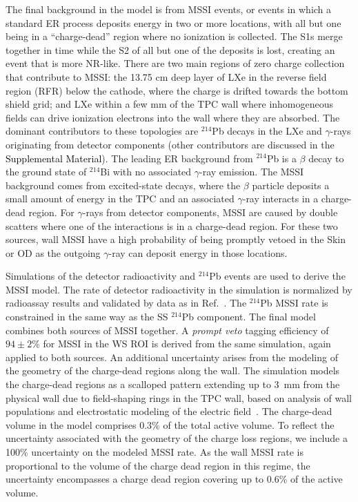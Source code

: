 The final background in the model is from MSSI events, or events in which a standard ER process deposits energy in two or more locations, with all but one being in a ``charge-dead'' region where no ionization is collected.
The S1s merge together in time while the S2 of all but one of the deposits is lost, creating an event that is more NR-like.
There are two main regions of zero charge collection that contribute to MSSI: the 13.75 cm deep layer of LXe in the reverse field region (RFR) below the cathode, where the charge is drifted towards the bottom shield grid; and LXe within a few mm of the TPC wall where inhomogeneous fields can drive ionization electrons into the wall where they are absorbed.
The dominant contributors to these topologies are $^{214}$Pb decays in the LXe and $\gamma$-rays originating from detector components (other contributors are discussed in the \textcolor{black}{Supplemental Material}).
The leading ER background from $^{214}$Pb is a $\beta$ decay to the ground state of $^{214}$Bi with no associated $\gamma$-ray emission.
The MSSI background comes from excited-state decays, where the $\beta$ particle deposits a small amount of energy in the TPC and an associated $\gamma$-ray interacts in a charge-dead region.
For $\gamma$-rays from detector components, MSSI are caused by double scatters where one of the interactions is in a charge-dead region.
For these two sources, wall MSSI have a high probability of being promptly vetoed in the Skin or OD as the outgoing $\gamma$-ray can deposit energy in those locations. 

Simulations of the detector radioactivity and $^{214}$Pb events are used to derive the MSSI model.  The rate of detector radioactivity in the simulation is normalized by radioassay results and validated by data as in Ref.~\cite{LZ:SR1Backgrounds_2022}. The $^{214}$Pb MSSI rate is constrained in the same way as the SS $^{214}$Pb component. The final model combines both sources of MSSI together. 
A \emph{prompt veto} tagging efficiency of $94\pm2$\% for MSSI in the WS ROI is derived from the same simulation, again applied to both sources. An additional uncertainty arises from the modeling of the geometry of the charge-dead regions along the wall. 
The simulation models the charge-dead regions as a scalloped pattern extending up to 3~mm from the physical wall due to field-shaping rings in the TPC wall, based on analysis of wall populations and electrostatic modeling of the electric field~\cite{dey2025a}. 
The charge-dead volume in the model comprises 0.3\% of the total active volume. To reflect the uncertainty associated with the geometry of the charge loss regions, we include a 100\% uncertainty on the modeled MSSI rate. As the wall MSSI rate is proportional to the volume of the charge dead region in this regime, the uncertainty encompasses a charge dead region covering up to $0.6$\% of the active volume. 

